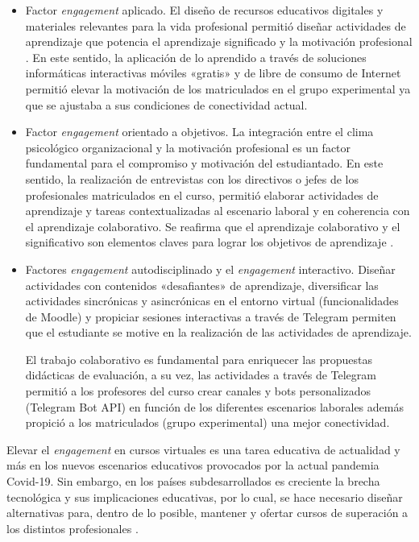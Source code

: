 \documentclass[spanish]{textolivre}
\begin{document}
\begin{itemize}
    \item Factor \emph{engagement} aplicado. El diseño de recursos educativos digitales y materiales relevantes para la vida profesional permitió diseñar actividades de aprendizaje que potencia el aprendizaje significado y la motivación profesional \cite{amaya2021}. %
    En este sentido, la aplicación de lo aprendido \cite{brown2017} %
    a través de soluciones informáticas interactivas móviles «gratis» y de libre de consumo de Internet permitió elevar la motivación de los matriculados en el grupo experimental ya que se ajustaba a sus condiciones de conectividad actual.
    
    \item Factor \emph{engagement} orientado a objetivos. La integración entre el clima psicológico organizacional y la motivación profesional es un factor fundamental para el compromiso y motivación del estudiantado. En este sentido, la realización de entrevistas con los directivos o jefes de los profesionales matriculados en el curso, permitió elaborar actividades de aprendizaje y tareas contextualizadas al escenario laboral y en coherencia con el aprendizaje colaborativo. Se reafirma que el aprendizaje colaborativo y el significativo son elementos claves para lograr los objetivos de aprendizaje \cite{cardona2015, li2020}. %
    
    \item Factores \emph{engagement} autodisciplinado y el \emph{engagement} interactivo. Diseñar actividades con contenidos «desafiantes» de aprendizaje, diversificar las actividades sincrónicas y asincrónicas en el entorno virtual (funcionalidades de Moodle) y propiciar sesiones interactivas a través de Telegram permiten que el estudiante se motive en la realización de las actividades de aprendizaje.
   
    El trabajo colaborativo \cite{cavinato2021} %
    es fundamental para enriquecer las propuestas didácticas de evaluación, a su vez, las actividades a través de Telegram permitió a los profesores del curso crear canales y bots personalizados (Telegram Bot API) en función de los diferentes escenarios laborales además propició a los matriculados (grupo experimental) una mejor conectividad.
\end{itemize} 

Elevar el \emph{engagement} en cursos virtuales es una tarea educativa de actualidad y más en los nuevos escenarios educativos provocados por la actual pandemia Covid-19. Sin embargo, en los países subdesarrollados es creciente la brecha tecnológica y sus implicaciones educativas, por lo cual, se hace necesario diseñar alternativas para, dentro de lo posible, mantener y ofertar cursos de superación a los distintos profesionales \cite{gonzalez2020, mahdy2020, ojeda2020, santiagoiglesias2021}. %
\end{document}
